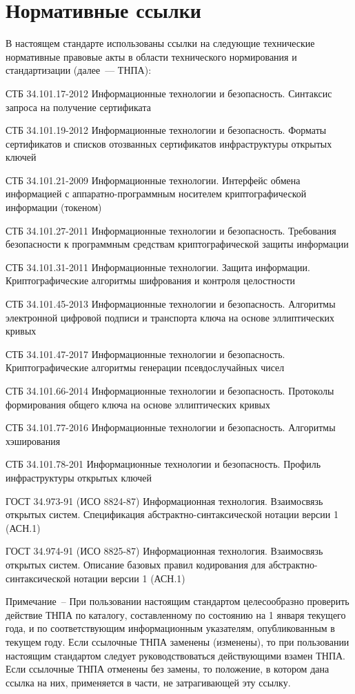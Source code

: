 \chapter{Нормативные ссылки}

В настоящем стандарте использованы ссылки на следующие технические 
нормативные правовые акты в области технического нормирования и 
стандартизации (далее~--- ТНПА): 

СТБ 34.101.17-2012 Информационные технологии и безопасность. 
Синтаксис запроса на получение сертификата
 
СТБ 34.101.19-2012 Информационные технологии и безопасность. Форматы 
сертификатов и списков отозванных сертификатов инфраструктуры открытых 
ключей 

СТБ 34.101.21-2009 Информационные технологии. Интерфейс обмена информацией
с аппаратно-программным носителем криптографической информации (токеном)

СТБ 34.101.27-2011 Информационные технологии и безопасность. Требования 
безопасности к программным средствам криптографической защиты информации 

СТБ 34.101.31-2011 Информационные технологии. Защита информации. 
Криптографические алгоритмы шифрования и контроля целостности 

СТБ 34.101.45-2013 Информационные технологии и безопасность. 
Алгоритмы электронной цифровой подписи и транспорта 
ключа на основе эллиптических кривых 

СТБ 34.101.47-2017 Информационные технологии и безопасность. 
Криптографические алгоритмы генерации псевдослучайных чисел 

СТБ 34.101.66-2014 Информационные технологии и безопасность. Протоколы 
формирования общего ключа на основе эллиптических кривых 

СТБ 34.101.77-2016 Информационные технологии и безопасность. 
Алгоритмы хэширования

СТБ 34.101.78-201 Информационные технологии и безопасность. 
Профиль инфраструктуры открытых ключей

ГОСТ 34.973-91 (ИСО 8824-87) Информационная технология. Взаимосвязь 
открытых систем. Спецификация абстрактно-синтаксической нотации версии 1 
(АСН.1) 

ГОСТ 34.974-91 (ИСО 8825-87) Информационная технология. Взаимосвязь 
открытых систем. Описание базовых правил кодирования для 
абстрактно-синтаксической нотации версии 1 (АСН.1) 

\begin{note}
Примечание~-- 
При пользовании настоящим стандартом целесообразно проверить действие 
ТНПА по каталогу, составленному по состоянию на 1 января текущего года, 
и по соответствующим информационным указателям, опубликованным в текущем году.
Если ссылочные ТНПА заменены (изменены), то при пользовании настоящим
стандартом следует руководствоваться действующими взамен ТНПА.
Если ссылочные ТНПА отменены без замены, то положение, в котором дана ссылка
на них, применяется в части, не затрагивающей эту ссылку.
\end{note}
